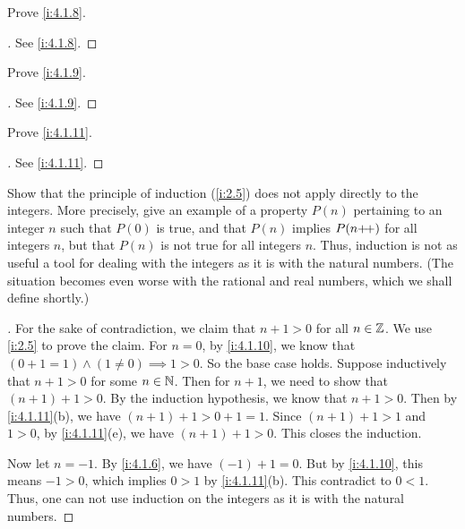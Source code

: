 \begin{ex}\label{i:ex:4.1.5}
  Prove \cref{i:4.1.8}.
\end{ex}

\begin{proof}[]
  See \cref{i:4.1.8}.
\end{proof}

\begin{ex}\label{i:ex:4.1.6}
  Prove \cref{i:4.1.9}.
\end{ex}

\begin{proof}[]
  See \cref{i:4.1.9}.
\end{proof}

\begin{ex}\label{i:ex:4.1.7}
  Prove \cref{i:4.1.11}.
\end{ex}

\begin{proof}[]
  See \cref{i:4.1.11}.
\end{proof}

\begin{ex}\label{i:ex:4.1.8}
  Show that the principle of induction (\cref{i:2.5}) does not apply directly to the integers.
  More precisely, give an example of a property \(P(n)\) pertaining to an integer \(n\) such that \(P(0)\) is true, and that \(P(n)\) implies \(P(n{+}\!{+})\) for all integers \(n\), but that \(P(n)\) is not true for all integers \(n\).
  Thus, induction is not as useful a tool for dealing with the integers as it is with the natural numbers.
  (The situation becomes even worse with the rational and real numbers, which we shall define shortly.)
\end{ex}

\begin{proof}[]
  For the sake of contradiction, we claim that \(n + 1 > 0\) for all \(n \in \mathbb{Z}\).
  We use \cref{i:2.5} to prove the claim.
  For \(n = 0\), by \cref{i:4.1.10}, we know that \((0 + 1 = 1) \land (1 \neq 0) \implies 1 > 0\).
  So the base case holds.
  Suppose inductively that \(n + 1 > 0\) for some \(n \in \mathbb{N}\).
  Then for \(n + 1\), we need to show that \((n + 1) + 1 > 0\).
  By the induction hypothesis, we know that \(n + 1 > 0\).
  Then by \cref{i:4.1.11}(b), we have \((n + 1) + 1 > 0 + 1 = 1\).
  Since \((n + 1) + 1 > 1\) and \(1 > 0\), by \cref{i:4.1.11}(e), we have \((n + 1) + 1 > 0\).
  This closes the induction.

  Now let \(n = -1\).
  By \cref{i:4.1.6}, we have \((-1) + 1 = 0\).
  But by \cref{i:4.1.10}, this means \(-1 > 0\), which implies \(0 > 1\) by \cref{i:4.1.11}(b).
  This contradict to \(0 < 1\).
  Thus, one can not use induction on the integers as it is with the natural numbers.
\end{proof}
